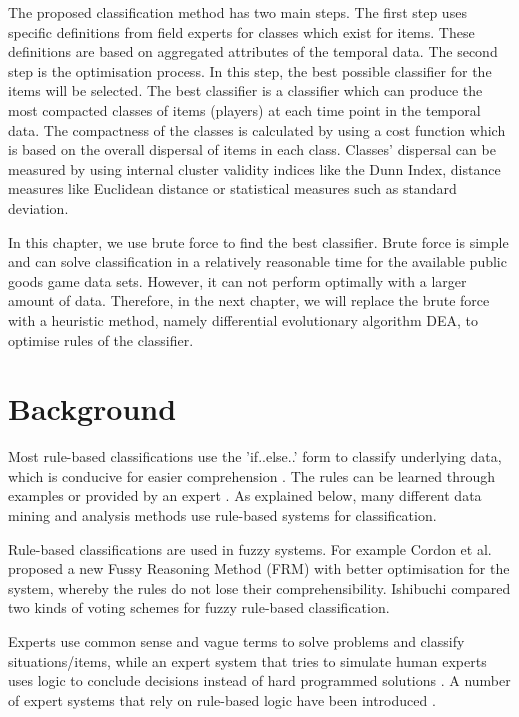 The proposed classification method has two main steps. The first step uses specific definitions from field experts for classes which exist for items. These definitions are based on aggregated attributes of the temporal data. The second step is the optimisation process. In this step, the best possible classifier for the items will be selected. The best classifier is a classifier which can produce the most compacted classes of items (players) at each time point in the temporal data. The compactness of the classes is calculated by using a cost function which is based on the overall dispersal of items in each class. Classes' dispersal can be measured by using internal cluster validity indices like the Dunn Index, distance measures like Euclidean distance or statistical measures such as standard deviation.

In this chapter, we use brute force to find the best classifier. Brute force is simple and can solve classification in a relatively reasonable time for the available public goods game data sets. However, it can not perform optimally with a larger amount of data. Therefore, in the next chapter, we will replace the brute force with a heuristic method, namely differential evolutionary algorithm DEA, to optimise rules of the classifier.


\section{Background}
Most rule-based classifications use the  'if..else..' form to classify underlying data, which is conducive for easier comprehension  \cite{Negnevitsky2002}. The rules can be learned through examples or provided by an expert \cite{Wang1992}. As explained below, many different data mining and analysis methods use rule-based systems for classification. 

Rule-based classifications are used in fuzzy systems. For example Cordon et al. \cite{Cordon1999} proposed a new Fussy Reasoning Method (FRM) with better optimisation for the system, whereby the rules do not lose their comprehensibility. Ishibuchi \cite{Ishibuchi1999} compared two kinds of voting schemes for fuzzy rule-based classification.

Experts use common sense and vague terms to solve problems and classify situations/items, while an expert system that tries to simulate human experts uses logic to conclude decisions instead of hard programmed solutions \cite{Negnevitsky2002}. A number of expert systems that rely on rule-based logic have been introduced \cite{Styvaktakis2002}.

